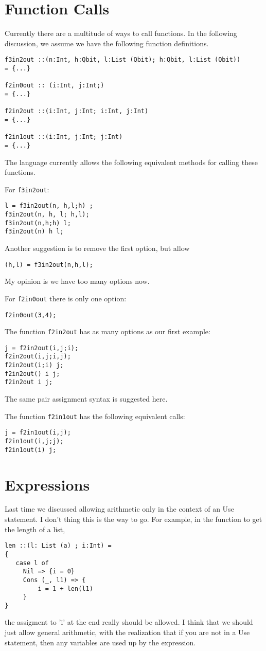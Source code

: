 \documentclass[12pt,letter]{article}
\date{2006-04-19}
\author{Brett Giles}
\begin{document}
\section{Function Calls}\label{sec:functioncalls}
Currently there are a multitude of ways to call functions. In the 
following discussion, we assume we have the following function definitions.
\begin{verbatim}
f3in2out ::(n:Int, h:Qbit, l:List (Qbit); h:Qbit, l:List (Qbit))
= {...}

f2in0out :: (i:Int, j:Int;)
= {...}

f2in2out ::(i:Int, j:Int; i:Int, j:Int)
= {...}

f2in1out ::(i:Int, j:Int; j:Int)
= {...}
\end{verbatim}

The language currently allows the following equivalent methods for calling
these functions.

For \verb|f3in2out|:
\begin{verbatim}
l = f3in2out(n, h,l;h) ;
f3in2out(n, h, l; h,l);
f3in2out(n,h;h) l;
f3in2out(n) h l;
\end{verbatim}
Another suggestion is to remove the first option, but allow 
\begin{verbatim}
(h,l) = f3in2out(n,h,l);
\end{verbatim}

My opinion is we have too many options now.

For \verb|f2in0out| there is only one option:
\begin{verbatim}
f2in0out(3,4);
\end{verbatim}

The function \verb|f2in2out| has as many options as our first example:
\begin{verbatim}
j = f2in2out(i,j;i);
f2in2out(i,j;i,j);
f2in2out(i;i) j;
f2in2out() i j;
f2in2out i j;
\end{verbatim}
The same pair assignment syntax is suggested here.

The function \verb|f2in1out| has the following equivalent calls:
\begin{verbatim}
j = f2in1out(i,j);
f2in1out(i,j;j);
f2in1out(i) j;
\end{verbatim}
\section{Expressions}\label{sec:Expressions}
Last time we discussed allowing arithmetic only in the context of an Use 
statement. I don't thing this is the way to go. For example, in the
function to get the length of a list,
\begin{verbatim}
len ::(l: List (a) ; i:Int) =
{
   case l of
     Nil => {i = 0}
     Cons (_, l1) => {
         i = 1 + len(l1)
     } 
}
\end{verbatim}
the assigment to 'i' at the end really should be allowed. I think that we 
should just allow general arithmetic, with the realization that if you 
are not in a Use statement, then any variables are used up by the expression.
\end{document}
